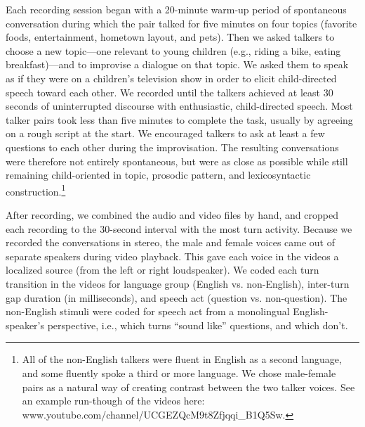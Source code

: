 \documentclass[authoryear, 12pt]{elsarticle}
\begin{document}
Each recording session began with a 20-minute warm-up period of spontaneous conversation during which the pair talked for five minutes on four topics (favorite foods, entertainment, hometown layout, and pets). Then we asked talkers to choose a new topic---one relevant to young children (e.g., riding a bike, eating breakfast)---and to improvise a dialogue on that topic. We asked them to speak as if they were on a children's television show in order to elicit child-directed speech toward each other. We recorded until the talkers achieved at least 30 seconds of uninterrupted discourse with enthusiastic, child-directed speech. Most talker pairs took less than five minutes to complete the task, usually by agreeing on a rough script at the start. We encouraged talkers to ask at least a few questions to each other during the improvisation. The resulting conversations were therefore not entirely spontaneous, but were as close as possible while still remaining child-oriented in topic, prosodic pattern, and lexicosyntactic construction.\footnote{All of the non-English talkers were fluent in English as a second language, and some fluently spoke a third or more language. We chose male-female pairs as a natural way of creating contrast between the two talker voices. See an example run-though of the videos here: www.youtube.com/channel/UCGEZQcM9t8Zfjqqi\_B1Q5Sw.}

After recording, we combined the audio and video files by hand, and cropped each recording to the 30-second interval with the most turn activity. Because we recorded the conversations in stereo, the male and female voices came out of separate speakers during video playback. This gave each voice in the videos a localized source (from the left or right loudspeaker). We coded each turn transition in the videos for language group (English vs. non-English), inter-turn gap duration (in milliseconds), and speech act (question vs. non-question). The non-English stimuli were coded for speech act from a monolingual English-speaker's perspective, i.e., which turns ``sound like'' questions, and which don't.
\end{document}
